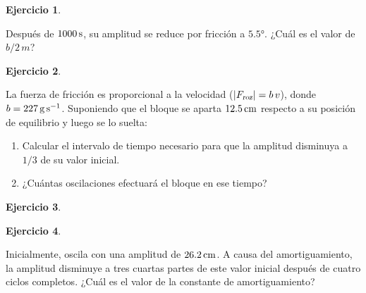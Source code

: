 \documentclass[a4paper,12pt,twoside]{book}
\newtheorem{ejercicio}{{Ejercicio}}[chapter]
\begin{document}
\begin{mdframed}[style=ejercicio-facil]
    \begin{ejercicio}
    \end{ejercicio}
    Después de $1000 \, \si{\second}$, su amplitud se reduce por fricción a $\ang{5.5}$.
    ¿Cuál es el valor de $b / 2 \, m$?
\end{mdframed}

\begin{mdframed}[style=ejercicio-intermedio]
    \begin{ejercicio}
    \end{ejercicio}
    \begin{center}
        \def\svgwidth{0.7\linewidth}
        
    \end{center}
    La fuerza de fricción es proporcional a la velocidad (${\left| {{{F}_\textsl{{roz}}}} \right|} = b \, v$), donde $b = 227 \, \si{\gram\per\second}$.
    Suponiendo que el bloque se aparta $12.5 \, \si{\centi\metre}$ respecto a su posición de equilibrio y luego se lo suelta:
    \begin{enumerate}
        \item Calcular el intervalo de tiempo necesario para que la amplitud disminuya a $1/3$ de su valor inicial.
        \item ¿Cuántas oscilaciones efectuará el bloque en ese tiempo?
    \end{enumerate}
\end{mdframed}

\begin{mdframed}[style=ejercicio-conceptual]
    \begin{ejercicio}
    \end{ejercicio}
\end{mdframed}

\begin{mdframed}[style=ejercicio-intermedio]
    \begin{ejercicio}
    \end{ejercicio}
    Inicialmente, oscila con una amplitud de $26.2 \, \si{\centi\metre}$.
    A causa del amortiguamiento, la amplitud disminuye a tres cuartas partes de este valor inicial después de cuatro ciclos completos.
    ¿Cuál es el valor de la constante de amortiguamiento?
\end{mdframed}
\end{document}

